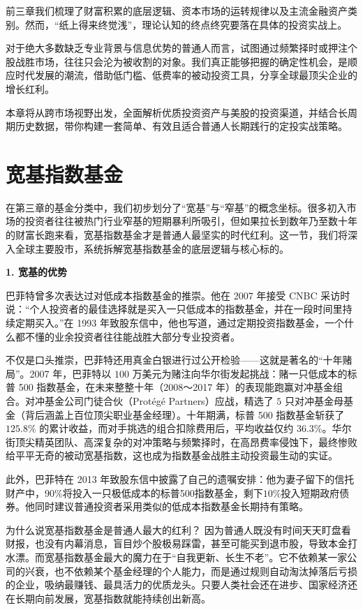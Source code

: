 \documentclass[12pt,openany]{book}
\newcommand{\subhead}[1]{%
    \par\vspace{0.5\baselineskip}%
    \noindent\textbf{#1}\par%
    \vspace{0.5\baselineskip}%
}
\begin{document}
前三章我们梳理了财富积累的底层逻辑、资本市场的运转规律以及主流金融资产类别。然而，“纸上得来终觉浅”，理论认知的终点终究要落在具体的投资实战上。

对于绝大多数缺乏专业背景与信息优势的普通人而言，试图通过频繁择时或押注个股战胜市场，往往只会沦为被收割的对象。我们真正能够把握的确定性机会，是顺应时代发展的潮流，借助低门槛、低费率的被动投资工具，分享全球最顶尖企业的增长红利。

本章将从跨市场视野出发，全面解析优质投资资产与美股的投资渠道，并结合长周期历史数据，带你构建一套简单、有效且适合普通人长期践行的定投实战策略。

\section{宽基指数基金}
\label{sec:broad_based_funds}

在第三章的基金分类中，我们初步划分了“宽基”与“窄基”的概念坐标。很多初入市场的投资者往往被热门行业窄基的短期暴利所吸引，但如果拉长到数年乃至数十年的财富长跑来看，宽基指数基金才是普通人最坚实的时代红利。这一节，我们将深入全球主要股市，系统拆解宽基指数基金的底层逻辑与核心标的。

\subhead{1. 宽基的优势}

巴菲特曾多次表达过对低成本指数基金的推崇。他在 2007 年接受 CNBC 采访时说：“个人投资者的最佳选择就是买入一只低成本的指数基金，并在一段时间里持续定期买入。”在 1993 年致股东信中，他也写道，通过定期投资指数基金，一个什么都不懂的业余投资者往往能战胜大部分专业投资者。

不仅是口头推崇，巴菲特还用真金白银进行过公开检验——这就是著名的“十年赌局”。2007 年，巴菲特以 $100$ 万美元为赌注向华尔街发起挑战：赌一只低成本的标普 500 指数基金，在未来整整十年（2008～2017 年）的表现能跑赢对冲基金组合。对冲基金公司门徒合伙（Protégé Partners）应战，精选了 $5$ 只对冲基金母基金（背后涵盖上百位顶尖职业基金经理）。十年期满，标普 500 指数基金斩获了 $125.8\%$ 的累计收益，而对手挑选的组合扣除费用后，平均收益仅约 $36.3\%$。华尔街顶尖精英团队、高深复杂的对冲策略与频繁择时，在高昂费率侵蚀下，最终惨败给平平无奇的被动宽基指数，这也成为指数基金战胜主动投资最生动的实证。

此外，巴菲特在 2013 年致股东信中披露了自己的遗嘱安排：他为妻子留下的信托财产中，$90\%$将投入一只极低成本的标普500指数基金，剩下$10\%$投入短期政府债券。他同时建议普通投资者采用类似的低成本指数基金长期持有策略。

为什么说宽基指数基金是普通人最大的红利？
因为普通人既没有时间天天盯盘看财报，也没有内幕消息，盲目炒个股极易踩雷，甚至可能买到退市股，导致本金打水漂。而宽基指数基金最大的魔力在于“自我更新、长生不老”。它不依赖某一家公司的兴衰，也不依赖某个基金经理的个人能力，而是通过规则自动淘汰掉落后亏损的企业，吸纳最赚钱、最具活力的优质龙头。只要人类社会还在进步、国家经济还在长期向前发展，宽基指数就能持续创出新高。
\end{document}
